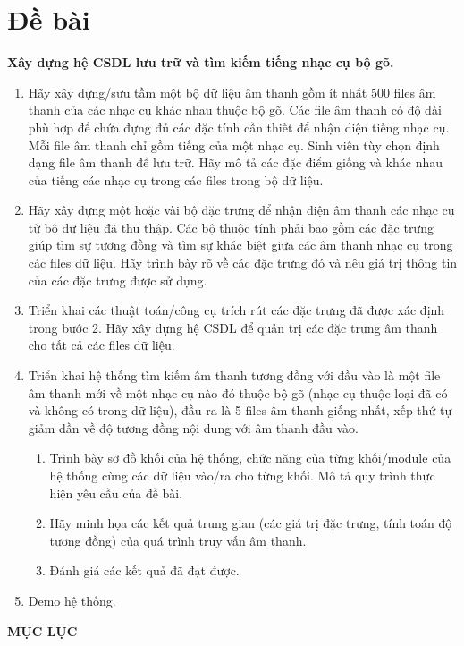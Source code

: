 \documentclass[11pt,a4paper]{article}
\begin{document}
\section*{Đề bài}
\textbf{Xây dựng hệ CSDL lưu trữ và tìm kiếm tiếng nhạc cụ bộ gõ.}
\begin{enumerate}[leftmargin=1.8em,itemsep=6pt,topsep=8pt]
\item Hãy xây dựng/sưu tầm một bộ dữ liệu âm thanh gồm ít nhất 500 files âm thanh của các nhạc cụ khác nhau thuộc bộ gõ. Các file âm thanh có độ dài phù hợp để chứa đựng đủ các đặc tính cần thiết để nhận diện tiếng nhạc cụ. Mỗi file âm thanh chỉ gồm tiếng của một nhạc cụ. Sinh viên tùy chọn định dạng file âm thanh để lưu trữ. Hãy mô tả các đặc điểm giống và khác nhau của tiếng các nhạc cụ trong các files trong bộ dữ liệu.
\item Hãy xây dựng một hoặc vài bộ đặc trưng để nhận diện âm thanh các nhạc cụ từ bộ dữ liệu đã thu thập. Các bộ thuộc tính phải bao gồm các đặc trưng giúp tìm sự tương đồng và tìm sự khác biệt giữa các âm thanh nhạc cụ trong các files dữ liệu. Hãy trình bày rõ về các đặc trưng đó và nêu giá trị thông tin của các đặc trưng được sử dụng.
\item Triển khai các thuật toán/công cụ trích rút các đặc trưng đã được xác định trong bước 2. Hãy xây dựng hệ CSDL để quản trị các đặc trưng âm thanh cho tất cả các files dữ liệu.
\item Triển khai hệ thống tìm kiếm âm thanh tương đồng với đầu vào là một file âm thanh mới về một nhạc cụ nào đó thuộc bộ gõ (nhạc cụ thuộc loại đã có và không có trong dữ liệu), đầu ra là 5 files âm thanh giống nhất, xếp thứ tự giảm dần về độ tương đồng nội dung với âm thanh đầu vào.
\begin{enumerate}[label=\alph*.,leftmargin=1.6em,itemsep=3pt,topsep=4pt]
\item Trình bày sơ đồ khối của hệ thống, chức năng của từng khối/module của hệ thống cùng các dữ liệu vào/ra cho từng khối. Mô tả quy trình thực hiện yêu cầu của đề bài.
\item Hãy minh họa các kết quả trung gian (các giá trị đặc trưng, tính toán độ tương đồng) của quá trình truy vấn âm thanh.
\item Đánh giá các kết quả đã đạt được.
\end{enumerate}
\item Demo hệ thống.
\end{enumerate}
\clearpage

{\centering\sffamily\bfseries\LARGE MỤC LỤC\par}
\vspace{18pt}
\makeatletter{}\makeatother
\clearpage
{}
\end{document}

